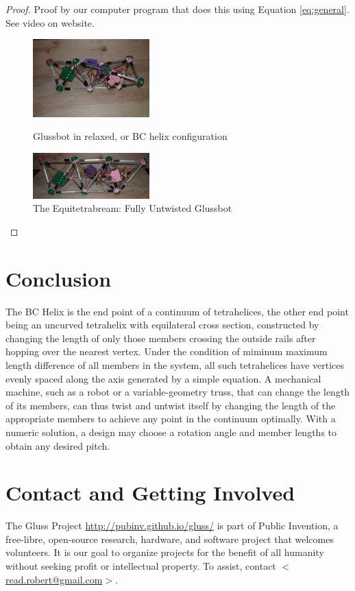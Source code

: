 \documentclass[11pt]{article}
\begin{document}
\begin{proof}
  Proof by our computer program that does this using Equation \eqref{eq:general}.
  See video on website\cite{readtetrahelix}.


\begin{figure}[H] %
  \centering
     \includegraphics[width=0.4\textwidth]{figures/GlussBotBC.jpg}
     \caption{Glussbot in relaxed, or BC helix configuration}
     \includegraphics[width=0.4\textwidth]{figures/GlussBotEquitetrabeamCropped.jpg}
     \caption{The Equitetrabream: Fully Untwisted Glussbot}
\end{figure}

\end{proof}

\section{Conclusion}

The BC Helix is the end point of a continuum of tetrahelices, the
other end point being an uncurved tetrahelix with equilateral cross
section, constructed by changing the length of only those members
crossing the outside rails after hopping over the nearest
vertex. Under the condition of miminum maximum length difference of
all members in the system, all such tetrahelices have vertices evenly
spaced along the axis generated by a simple equation.  A mechanical
machine, such as a robot or a variable-geometry truss, that can change
the length of its members, can thus twist and untwist itself by
changing the length of the appropriate members to achieve any point in
the continuum optimally. With a numeric solution, a design may choose
a rotation angle and member lengths to obtain any desired pitch.

\section{Contact and Getting Involved}

The Gluss Project \url{http://pubinv.github.io/gluss/} is part of Public Invention,
a free-libre, open-source research, hardware, and software project that welcomes volunteers.
It is our goal to organize projects for the benefit of all humanity without seeking profit or intellectual property.
To assist, contact \href{mailto:read.robert@gmail.com}{$<$read.robert@gmail.com$>$}.



\end{document}
